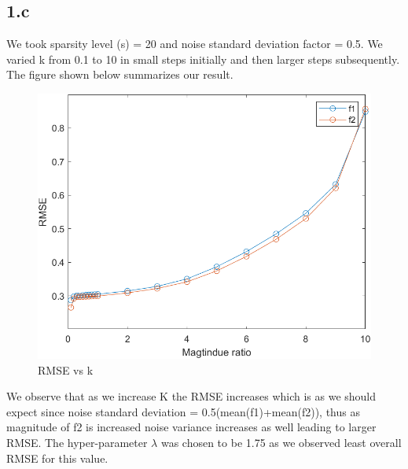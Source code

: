 \documentclass[12pt]{article}
\begin{document}
\subsection*{1.c}
We took sparsity level (s) = 20 and noise standard deviation factor = 0.5. We varied k from 0.1 to 10 in small steps initially and then larger steps subsequently. The figure shown below summarizes our result.
\begin{figure}[H]
  \centering
  \includegraphics[scale=0.75]{assignment4/rmse_mag.png}  %
  \caption{RMSE vs k}
  \label{fig:2}
\end{figure}
We observe that as we increase K the RMSE increases which is as we should expect since noise standard deviation = 0.5(mean(f1)+mean(f2)), thus as magnitude of f2 is increased noise variance increases as well leading to larger RMSE. The hyper-parameter $\lambda$ was chosen to be 1.75 as we observed least overall RMSE for this value.
\end{document}
